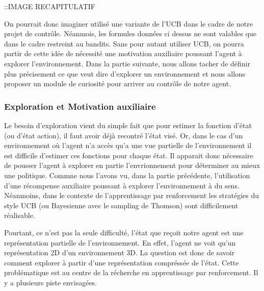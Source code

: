 ::IMAGE RECAPITULATIF

On pourrait donc imaginer utilisé une variante de l'\gls{UCB} dans le cadre de notre projet de contrôle. Néanmois, les formules données ci dessus ne sont valables que dans le cadre restreint au bandits. 
Sans pour autant utiliser \gls{UCB}, on pourra partir de cette idée de nécessité une motivation auxiliaire poussant l'agent à explorer l'environnement. Dans la partie suivante, nous allons tacher de définir plus précisement ce que veut dire d'explorer un environnement et nous allons proposer un module de curiosité pour arriver au contrôle de notre agent.

\subsubsection{Exploration et Motivation auxiliaire}

Le besoin d'exploration vient du simple fait que pour estimer la fonction d'état (ou d'état action), il faut avoir déjà recontré l'état visé. Or, dans le cas d'un environnement où l'agent n'a accès qu'a une vue partielle de l'environnement il est difficile d'estimer ces fonctions pour chaque état. Il apparait donc nécessaire de pousser l'agent à explorer en partie l'envrionnement pour déterminer au mieux une politique. Commne nous l'avons vu, dans la partie précédente, l'utilisation d'une récompense auxiliaire poussant à explorer l'environnement à du sens. Néanmoins, dans le contexte de l'apprentissage par renforcement les stratégies du style UCB (ou Bayesienne avec le sampling de Thomson) sont difficilement réalisable.

Pourtant, ce n'est pas la seule difficulté, l'état que reçoit notre agent est une représentation partielle de l'environnement. En effet, l'agent ne voit qu'un représentation 2D d'un environnement 3D. La question est donc de savoir comment explorer à partir d'une représentation compréssée de l'état. Cette problématique est au centre de la récherche en apprentissage par renforcement. Il y a plusieurs piste envisagées.

